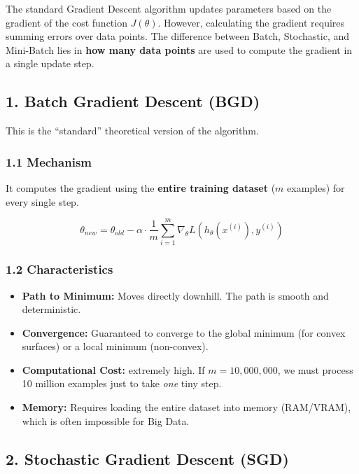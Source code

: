 \documentclass[
  italian,
  11pt,
]{article}
\begin{document}
The standard Gradient Descent algorithm updates parameters based on the
gradient of the cost function \(J(\theta)\). However, calculating the
gradient requires summing errors over data points. The difference
between Batch, Stochastic, and Mini-Batch lies in \textbf{how many data
points} are used to compute the gradient in a single update step.

\subsection{1. Batch Gradient Descent
(BGD)}\label{batch-gradient-descent-bgd}

This is the ``standard'' theoretical version of the algorithm.

\subsubsection{1.1 Mechanism}\label{mechanism}

It computes the gradient using the \textbf{entire training dataset}
(\(m\) examples) for every single step.

\[\theta_{new} = \theta_{old} - \alpha \cdot \frac{1}{m} \sum_{i=1}^{m} \nabla_\theta L(h_\theta(x^{(i)}), y^{(i)})\]

\subsubsection{1.2 Characteristics}\label{characteristics}

\begin{itemize}
\item
  \textbf{Path to Minimum:} Moves directly downhill. The path is smooth
  and deterministic.
\item
  \textbf{Convergence:} Guaranteed to converge to the global minimum
  (for convex surfaces) or a local minimum (non-convex).
\item
  \textbf{Computational Cost:} extremely high. If \(m = 10,000,000\), we
  must process 10 million examples just to take \emph{one} tiny step.
\item
  \textbf{Memory:} Requires loading the entire dataset into memory
  (RAM/VRAM), which is often impossible for Big Data.
\end{itemize}

\subsection{2. Stochastic Gradient Descent
(SGD)}\label{stochastic-gradient-descent-sgd}
\end{document}
